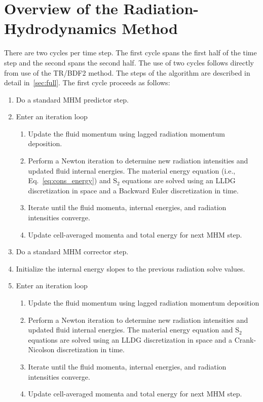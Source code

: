 \documentclass[preprint,12pt]{elsarticle}
\begin{document}
\section{Overview of the Radiation-Hydrodynamics Method}
\label{sec:Method}

There are two cycles per time step.  The first cycle spans the first half of the time step and the second 
spans the second half. The use of two cycles follows directly from use of the TR/BDF2
method.  The steps of the algorithm are described in detail in~\ref{sec:full}.  The first cycle proceeds as follows:
\begin{enumerate}
  \item Do a standard MHM predictor step. 
  \item Enter an iteration loop
  \begin{enumerate}
    \item Update the fluid momentum using lagged radiation momentum deposition.
    \item Perform a Newton iteration to determine new radiation intensities and updated fluid internal energies.  The material energy equation (i.e.,
        Eq.~\eqref{eq:cons_energy}) and S$_2$ equations are solved using an LLDG discretization in space and a Backward Euler discretization in time.
    \item Iterate until the fluid momenta, internal energies, and radiation intensities converge.
    \item Update cell-averaged momenta and total energy for next MHM step.
  \end{enumerate}
  \item Do a standard MHM corrector step.
  \item Initialize the internal energy slopes to the previous radiation solve values.
  \item Enter an iteration loop
  \begin{enumerate}
    \item Update the fluid momentum using lagged radiation momentum deposition
    \item Perform a Newton iteration to determine new radiation intensities and updated fluid internal energies.  The material energy equation
          and S$_2$ equations are solved using an LLDG discretization in space and a Crank-Nicolson discretization in time.
    \item Iterate until the fluid momenta, internal energies, and radiation intensities converge.
    \item Update cell-averaged momenta and total energy for next MHM step.
  \end{enumerate}
\end{enumerate}
\end{document}
